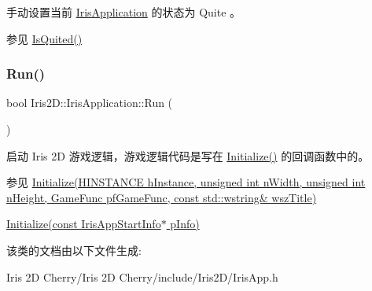 手动设置当前 \hyperlink{class_iris2_d_1_1_iris_application}{Iris\+Application} 的状态为 Quite 。 

\begin{DoxySeeAlso}{参见}
\hyperlink{class_iris2_d_1_1_iris_application_ae9760ff496a4c80f96ad49331407c2e4}{Is\+Quited()} 
\end{DoxySeeAlso}
\mbox{\label{class_iris2_d_1_1_iris_application_ae6bb59365978c945201fd8cf82105e4f}} 
\subsubsection{\texorpdfstring{Run()}{Run()}}
{\footnotesize\ttfamily bool Iris2\+D\+::\+Iris\+Application\+::\+Run (\begin{DoxyParamCaption}{ }\end{DoxyParamCaption})}



启动 Iris 2D 游戏逻辑，游戏逻辑代码是写在 \hyperlink{class_iris2_d_1_1_iris_application_a84f3ddebb3a3ffb0c172bd41fb952e1a}{Initialize()} 的回调函数中的。 

\begin{DoxySeeAlso}{参见}
\hyperlink{class_iris2_d_1_1_iris_application_a84f3ddebb3a3ffb0c172bd41fb952e1a}{Initialize(\+H\+I\+N\+S\+T\+A\+N\+C\+E h\+Instance, unsigned int n\+Width, unsigned int n\+Height, Game\+Func pf\+Game\+Func, const std\+::wstring\& wsz\+Title)} 

\hyperlink{class_iris2_d_1_1_iris_application_ac20656815694f980fccfc4369727a9a9}{Initialize(const Iris\+App\+Start\+Info$\ast$ p\+Info)} 
\end{DoxySeeAlso}


该类的文档由以下文件生成\+:\begin{DoxyCompactItemize}
\item 
Iris 2\+D Cherry/\+Iris 2\+D Cherry/include/\+Iris2\+D/Iris\+App.\+h\end{DoxyCompactItemize}
